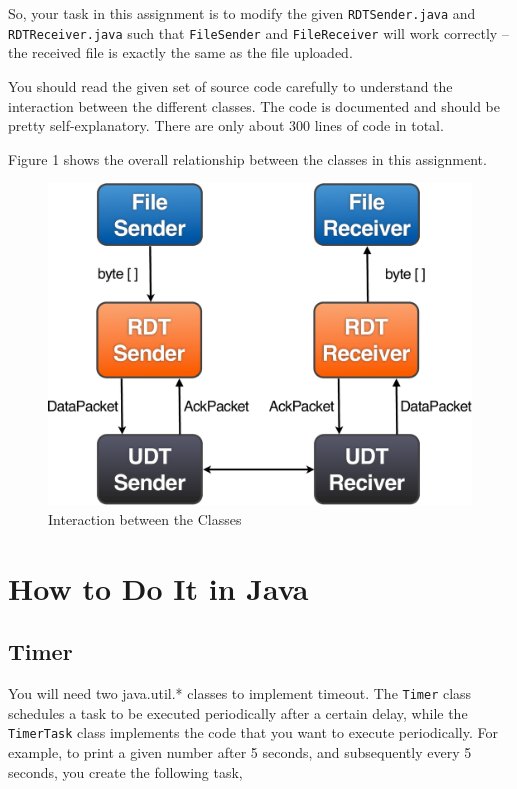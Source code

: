 \documentclass[a4paper,11pt]{exam}
\begin{document}
So, your task in this assignment is to modify the given \texttt{RDTSender.java} and \texttt{RDTReceiver.java} such that \texttt{FileSender} and \texttt{FileReceiver} will work correctly -- the received file is exactly the same as the file uploaded.  

You should read the given set of source code carefully to understand the interaction between the different classes.  The code is documented and should be pretty self-explanatory.  There are only about 300 lines of code in total.

Figure 1 shows the overall relationship between the classes in this assignment.

\begin{figure}
	\begin{center}
	\includegraphics[scale=0.25]{flow-crop.pdf}
	\caption{Interaction between the Classes}
	\end{center}
\end{figure}

\section*{How to Do It in Java}

\subsection*{Timer}

You will need two java.util.* classes to implement timeout.  The \texttt{Timer} class schedules a task to be executed periodically after a certain delay, while the \texttt{TimerTask} class implements the code that you want to execute periodically.  For example, to print a given number after 5 seconds, and subsequently every 5 seconds, you create the following task, 
\newpage
\end{document}
